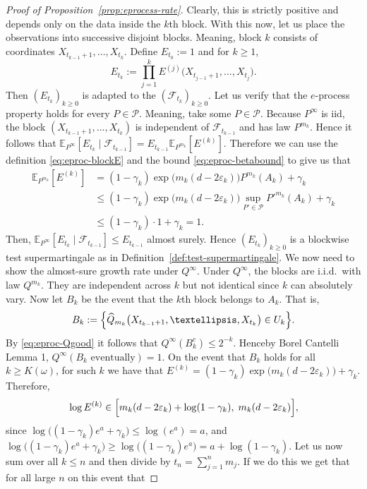 \documentclass[10pt,a4paper]{amsart}
\newcommand{\E}{\mathbb{E}}
\newcommand{\Pcal}{\mathcal{P}}
\begin{document}
\begin{proof}[Proof of Proposition~\ref{prop:eprocess-rate}]
Clearly, this is strictly positive and depends only on the data inside the $k$th block. With this now, let us place the observations into successive disjoint blocks. Meaning, block $k$ consists of coordinates $X_{t_{k-1}+1},\dots,X_{t_k}$. Define $E_{t_0}:=1$ and for $k\ge 1$,
\[
E_{t_k}:=\prod_{j=1}^k E^{(j)}\bigl(X_{t_{j-1}+1},\dots,X_{t_j}\bigr).
\]
Then $(E_{t_k})_{k\ge 0}$ is adapted to the $(\mathcal F_{t_k})_{k\ge 0}$. Let us verify that the $e$-process property holds for every $P\in\Pcal$. Meaning, take some $P\in\Pcal$. Because $P^\infty$ is iid, the block $(X_{t_{k-1}+1},\dots, X_{t_k})$ is independent of $\mathcal F_{t_{k-1}}$ and has law $P^{m_k}$. Hence it follows that $\E_{P^\infty}[E_{t_k}\mid \mathcal F_{t_{k-1}}]= E_{t_{k-1}}\E_{P^{m_k}}\left[E^{(k)}\right]$. Therefore we can use the definition \eqref{eq:eproc-blockE} and the bound \eqref{eq:eproc-betabound} to give us that
\begin{align*}
\E_{P^{m_k}}\left[E^{(k)}\right]&=(1-\gamma_k)\exp\bigl(m_k(d-2\varepsilon_k)\bigr)P^{m_k}(A_k)+\gamma_k\\
&\le(1-\gamma_k)\exp\bigl(m_k(d-2\varepsilon_k)\bigr)\sup_{P'\in\Pcal}P'^{m_k}(A_k)+\gamma_k\\
&\le(1-\gamma_k)\cdot 1+\gamma_k=1.
\end{align*}
Then, $\E_{P^\infty}[E_{t_k}\mid\mathcal F_{t_{k-1}}]\le E_{t_{k-1}}$ almost surely. Hence $(E_{t_k})_{k\ge 0}$ is a blockwise test supermartingale as in Definition~\ref{def:test-supermartingale}. We now need to show the almost-sure growth rate under $Q^\infty$. Under $Q^\infty$, the blocks are i.i.d.\ with law $Q^{m_k}$. They are independent across $k$ but not identical since $k$ can absolutely vary. Now let $B_k$ be the event that the $k$th block belongs to $A_k$. That is,
\[
B_k:=\Bigl\{\widehat Q_{m_k}\bigl(X_{t_{k-1}+1},\dots,X_{t_k}\bigr)\in U_k\Bigr\}.
\]
By \eqref{eq:eproc-Qgood} it follows that $Q^\infty(B_k^c)\le 2^{-k}$. Henceby Borel Cantelli Lemma 1, $Q^\infty(B_k\text{ eventually})=1$. On the event that $B_k$ holds for all $k\ge K(\omega)$, for such $k$ we have that $E^{(k)}=(1-\gamma_k)\exp\bigl(m_k(d-2\varepsilon_k)\bigr)+\gamma_k$. Therefore,
\[
\log E^{(k)} \in \Bigl[m_k(d-2\varepsilon_k)+\log(1-\gamma_k),\;m_k(d-2\varepsilon_k)\Bigr],
\]
since $\log\bigl((1-\gamma_k)e^{a}+\gamma_k\bigr)\le \log(e^a)=a$, and $\log\bigl((1-\gamma_k)e^{a}+\gamma_k\bigr)\ge \log\bigl((1-\gamma_k)e^{a}\bigr)=a+\log(1-\gamma_k)$. Let us now sum over all $k\le n$ and then divide by $t_n=\sum_{j=1}^n m_j$. If we do this we get that for all large $n$ on this event that

\end{proof}
\end{document}
